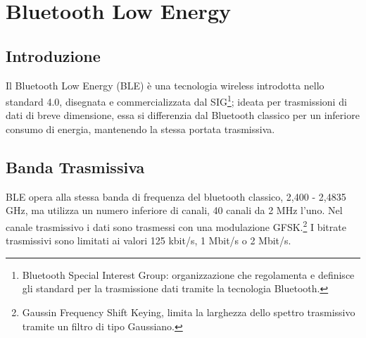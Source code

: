 
\section{Bluetooth Low Energy}
\subsection{Introduzione}
Il Bluetooth Low Energy (BLE) è una tecnologia wireless introdotta nello standard 4.0, disegnata e commercializzata dal SIG\footnote{Bluetooth Special Interest Group: organizzazione che regolamenta e definisce gli standard  per la trasmissione dati tramite la tecnologia Bluetooth.}; ideata per trasmissioni di dati di breve dimensione, essa si differenzia dal Bluetooth classico per un inferiore consumo di energia, mantenendo la stessa portata trasmissiva.

\subsection{Banda Trasmissiva}
BLE opera alla stessa banda di frequenza del bluetooth classico, 2,400 - 2,4835 GHz, ma utilizza un numero inferiore di canali, 40 canali da 2 MHz l'uno.
Nel canale trasmissivo i dati sono trasmessi con una modulazione GFSK.\footnote{Gaussin Frequency Shift Keying, limita la larghezza dello spettro trasmissivo tramite un filtro di tipo Gaussiano.}
I bitrate trasmissivi sono limitati ai valori 125 kbit/s, 1 Mbit/s o 2 Mbit/s.

